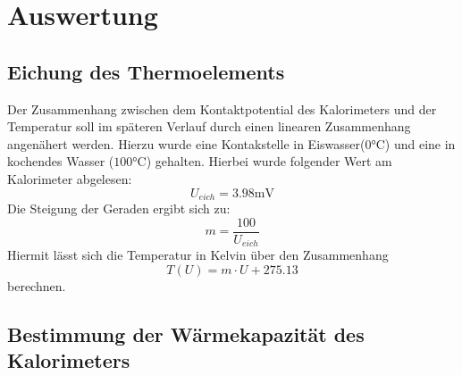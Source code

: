 \section{Auswertung}
\subsection{Eichung des Thermoelements}
Der Zusammenhang zwischen dem Kontaktpotential des Kalorimeters und der Temperatur soll im späteren Verlauf
durch einen linearen Zusammenhang angenähert werden. Hierzu wurde eine Kontakstelle in Eiswasser($0 \si{\celsius}$)
und eine in kochendes Wasser ($100 \si{\celsius}$) gehalten. Hierbei wurde folgender Wert am Kalorimeter abgelesen:
\begin{equation}
  U_{eich} = 3.98 \si{\milli\volt}
\end{equation}
Die Steigung der Geraden ergibt sich zu:
\begin{equation}
  m = \frac{100}{U_{eich}}
\end{equation}
Hiermit lässt sich die Temperatur in Kelvin über den Zusammenhang
\begin{equation}
  T(U) = m \cdot U + 275.13
\end{equation}
berechnen.

\subsection{Bestimmung der Wärmekapazität des Kalorimeters}
